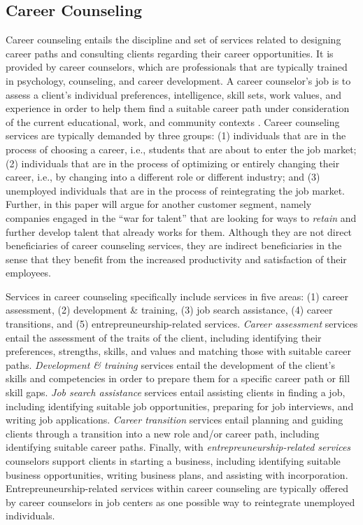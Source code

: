 \subsection{Career Counseling}

Career counseling entails the discipline and set of services related to designing career paths and consulting
clients regarding their career opportunities. It is provided by career counselors, which are professionals that
are typically trained in psychology, counseling, and career development. A career counselor's job is to assess 
a client's individual preferences, intelligence, skill sets, work values, and experience in order to help them
find a suitable career path under consideration of the current educational, work, and community contexts
\citep{americanpsychologicalassociationCareerCounseling}. Career counseling services are typically demanded by
three groups: (1) individuals that are in the process of choosing a career, i.e., students that are about to enter
the job market; (2) individuals that are in the process of optimizing or entirely changing their career, i.e.,
by changing into a different role or different industry; and (3) unemployed individuals that are in the process
of reintegrating the job market. Further, in this paper will argue for another customer segment, namely companies
engaged in the ``war for talent'' that are looking for ways to \textit{retain} and further develop talent that
already works for them. Although they are not direct beneficiaries of career counseling services, they are
indirect beneficiaries in the sense that they benefit from the increased productivity and satisfaction of their
employees.

Services in career counseling specifically include services in five areas: (1) career assessment, (2) development
\& training, (3) job search assistance, (4) career transitions, and (5) entrepreuneurship-related services.
\textit{Career assessment} services entail the assessment of the traits of the client, including identifying their
preferences, strengths, skills, and values and matching those with suitable career paths. \textit{Development
\& training} services entail the development of the client's skills and competencies in order to prepare them
for a specific career path or fill skill gaps. \textit{Job search assistance} services entail assisting clients
in finding a job, including identifying suitable job opportunities, preparing for job interviews, and writing
job applications. \textit{Career transition} services entail planning and guiding clients through a transition
into a new role and/or career path, including identifying suitable career paths. Finally, with
\textit{entrepreuneurship-related services} counselors support clients in starting a business, including identifying
suitable business opportunities, writing business plans, and assisting with incorporation. Entrepreuneurship-related
services within career counseling are typically offered by career counselors in job centers as one possible way to
reintegrate unemployed individuals.


